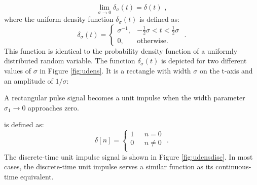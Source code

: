  \begin{equation}
    \lim_{\sigma \rightarrow 0} \delta_{\sigma}(t) = \delta(t)\,\,,
  \end{equation}
  where the uniform density function $\delta_{\sigma}(t)$ is defined as:
  \begin{equation}
    \delta_{\sigma}(t) =\left\{ \begin{array}{cl}
      \sigma^{-1}, & -\frac{1}{2}\sigma < t < \frac{1}{2}\sigma \\
      0,           & \mathrm{otherwise}.\end{array}
    \right.\,\,.
  \end{equation}
  This function is identical to the probability density function of a
  uniformly distributed random variable. The function
  $\delta_{\sigma}(t)$ is depicted for two different values of $\sigma$
  in Figure \ref{fig:udens}. It is a rectangle with width $\sigma$ on
  the t-axis and an amplitude of $1/\sigma$:
  \begin{marginfigure}
    \begin{center}
    \end{center}
    \caption{A rectangular pulse signal becomes a unit impulse when the width parameter $\sigma_1 \rightarrow 0$ approaches zero.}
    \label{fig:udens}
  \end{marginfigure}
\fi


 is defined as:
\begin{equation}
  \delta[n] = \left\{\begin{array}{cl}
    1 & ~~~ n = 0   \\
    0 & ~~~ n \ne 0 \\
  \end{array}
  \right.\,\,.
\end{equation}
The discrete-time unit impulse signal is shown in
Figure \ref{fig:udensdisc}. In most cases, the discrete-time unit
impulse serves a similar function as its continuous-time equivalent.

